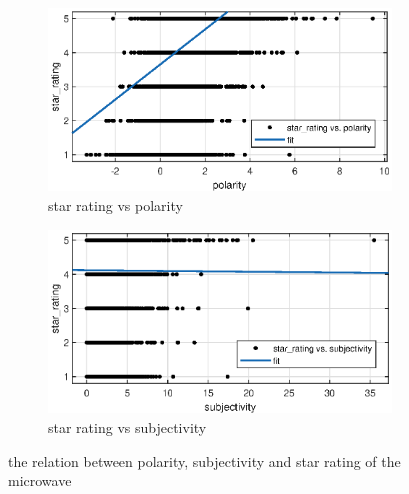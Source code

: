 \documentclass[12pt]{article}  %
\begin{document}
\begin{figure}[H]
  \centering
  \begin{subfigure}{.5\textwidth}
    \centering
    \includegraphics[width=\linewidth]{figures/microwave/polarity_vs_star_rating.eps}
    \caption{star rating vs polarity}
    \label{fig:}
  \end{subfigure}%
  \begin{subfigure}{.5\textwidth}
    \centering
    \includegraphics[width=\linewidth]{figures/microwave/subjectivity_vs_star_rating.eps}
    \caption{star rating vs subjectivity}
    \label{fig:}
  \end{subfigure}
  \caption{the relation between polarity, subjectivity and star rating of the microwave}
  \label{fig:}
\end{figure}
\end{document}
